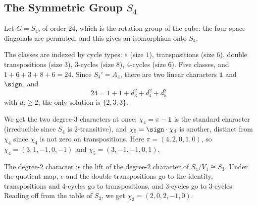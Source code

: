 \subsection{The Symmetric Group \texorpdfstring{$S_4$}{S4}}

Let $G = S_4$, of order $24$, which is the rotation group of the cube: the four space diagonals are permuted, and this gives an isomorphism onto $S_4$.

\begin{center}
\end{center}

The classes are indexed by cycle types: $e$ (size $1$), transpositions (size $6$), double transpositions (size $3$), $3$-cycles (size $8$), $4$-cycles (size $6$). Five classes, and $1+6+3+8+6 = 24$. Since $S_4' = A_4$, there are two linear characters $\mathbf 1$ and $\sign$, and
$$24 = 1 + 1 + d_3^2+d_4^2+d_5^2$$
with $d_i\geq 2$; the only solution is $\{2,3,3\}$.

We get the two degree-$3$ characters at once: $\chi_4 = \pi - \mathbf1$ is the standard character (irreducible since $S_4$ is $2$-transitive), and $\chi_5 = \sign\cdot\chi_4$ is another, distinct from $\chi_4$ since $\chi_4$ is not zero on transpositions. Here $\pi = (4,2,0,1,0)$, so $\chi_4 = (3,1,-1,0,-1)$ and $\chi_5 = (3,-1,-1,0,1)$.

The degree-$2$ character is the lift of the degree-$2$ character of $S_4/V_4\cong S_3$. Under the quotient map, $e$ and the double transpositions go to the identity, transpositions and $4$-cycles go to transpositions, and $3$-cycles go to $3$-cycles. Reading off from the table of $S_3$, we get $\chi_3 = (2,0,2,-1,0)$.


